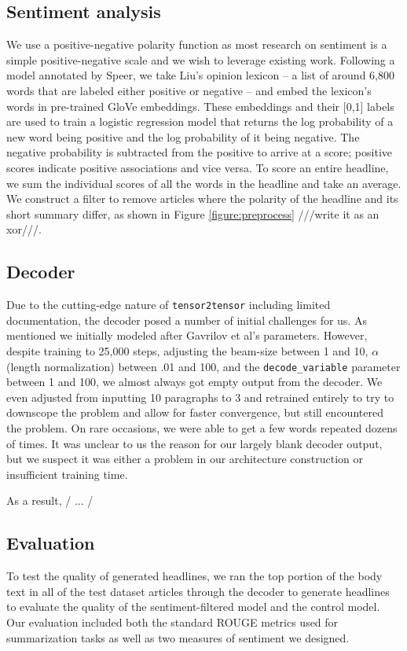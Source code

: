 \documentclass[11pt]{article}
\begin{document}
\subsection{Sentiment analysis}
We use a positive-negative polarity function as most research on sentiment is a simple positive-negative scale and we wish to leverage existing work. Following a model annotated by Speer\cite{RacistAI}, we take Liu's opinion lexicon\cite{Hu:2004:MSC:1014052.1014073} -- a list of around 6,800 words that are labeled either positive or negative -- and embed the lexicon's words in pre-trained GloVe embeddings. These embeddings and their [0,1] labels are used to train a logistic regression model that returns the log probability of a new word being positive and the log probability of it being negative. The negative probability is subtracted from the positive to arrive at a score; positive scores indicate positive associations and vice versa. To score an entire headline, we sum the individual scores of all the words in the headline and take an average. We construct a filter to remove articles where the polarity of the headline and its short summary differ, as shown in Figure \ref{figure:preprocess} ///write it as an xor///.

\subsection{Decoder}
Due to the cutting-edge nature of \texttt{tensor2tensor} including limited documentation, the decoder posed a number of initial challenges for us. As mentioned we initially modeled after Gavrilov et al's parameters. However, despite training to 25,000 steps, adjusting the beam-size between 1 and 10, $\alpha$ (length normalization) between .01 and 100, and the \texttt{decode\_variable} parameter between 1 and 100, we almost always got empty output from the decoder. We even adjusted from inputting 10 paragraphs to 3 and retrained entirely to try to downscope the problem and allow for faster convergence, but still encountered the problem. On rare occasions, we were able to get a few words repeated dozens of times. It was unclear to us the reason for our largely blank decoder output, but we suspect it was either a problem in our architecture construction or insufficient training time.

As a result, / ... /

\subsection{Evaluation}
To test the quality of generated headlines, we ran the top portion of the body text in all of the test dataset articles through the decoder to generate headlines to evaluate the quality of the sentiment-filtered model and the control model. Our evaluation included both the standard ROUGE metrics used for summarization tasks as well as two measures of sentiment we designed.
\end{document}
